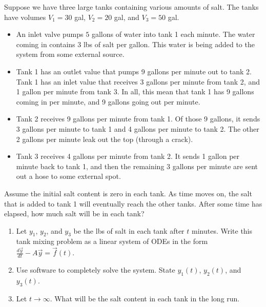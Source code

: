 \begin{problem} 
Suppose we have three large tanks containing various amounts of salt. 
The tanks have volumes $V_1=30$ gal, $V_2=20$ gal, and $V_3=50$ gal.  
\begin{itemize}
 \item An inlet valve pumps $5$ gallons of water into tank 1 each minute. The water coming in contains 3 lbs of salt per gallon. This water is being added to the system from some external source.   
 \item Tank 1 has an outlet value that pumps 9 gallons per minute out to tank 2. Tank 1 has an inlet value that receives 3 gallons per minute from tank 2, and 1 gallon per minute from tank 3. In all, this mean that tank 1 has 9 gallons coming in per minute, and 9 gallons going out per minute.
 \item Tank 2 receives 9 gallons per minute from tank 1.  Of those 9 gallons, it sends 3 gallons per minute to tank 1 and 4 gallons per minute to tank 2.  The other 2 gallons per minute leak out the top (through a crack).
 \item Tank 3 receives 4 gallons per minute from tank 2.  It sends 1 gallon per minute back to tank 1, and then the remaining 3 gallons per minute are sent out a hose to some external spot.  
\end{itemize}
Assume the initial salt content is zero in each tank.  As time moves on, the salt that is added to tank 1 will eventually reach the other tanks.  After some time has elapsed, how much salt will be in each tank? %
\begin{enumerate}
 \item Let $y_1$, $y_2$, and $y_3$ be the lbs of salt in each tank after $t$ minutes.  Write this tank mixing problem as a linear system of ODEs in the form $\frac{d\vec y}{dt} - A\vec y = \vec f(t)$.
 \item Use software to completely solve the system. State $y_1(t)$, $y_2(t)$, and $y_3(t)$. 
 \item Let $t\to \infty$. What will be the salt content in each tank in the long run.
\end{enumerate}
\end{problem}

